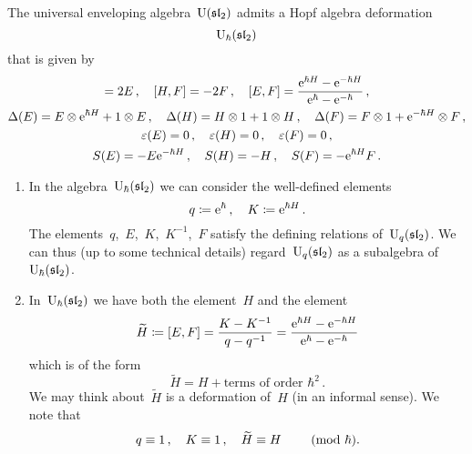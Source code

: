 \documentclass[a4paper, 11pt, oneside]{scrartcl}
\begin{document}
\begin{remark}
\end{remark}

\begin{theorem}
  The universal enveloping algebra~$\operatorname{U}(\mathfrak{sl}_2)$ admits a Hopf algebra deformation
  \[
    \operatorname{U}_{\hbar}(\mathfrak{sl}_2)
  \]
  that is given by
  \begin{gather*}
    [H, E] = 2E \,,
    \quad
    [H, F] = -2F \,,
    \quad
    [E, F]
    =
    \frac{ \e^{\hbar H} - \e^{-\hbar H} }{ \e^{\hbar} - \e^{-\hbar} } \,,
    \\
    \Delta(E) = E \tensor \e^{\hbar H} + 1 \tensor E \,,
    \quad
    \Delta(H) = H \tensor 1 + 1 \tensor H \,,
    \quad
    \Delta(F) = F \tensor 1 + \e^{-\hbar H} \tensor F \,,
    \\
    \varepsilon(E) = 0 \,,
    \quad
    \varepsilon(H) = 0 \,,
    \quad
    \varepsilon(F) = 0 \,,
    \\
    S(E) = -E \e^{-\hbar H} \,,
    \quad
    S(H) = -H \,,
    \quad
    S(F) = - \e^{\hbar H} F \,.
  \end{gather*}
\end{theorem}

\begin{remark}
  \leavevmode
  \begin{enumerate}
    \item
      In the algebra~$\operatorname{U}_{\hbar}(\mathfrak{sl}_2)$ we can consider the well-defined elements
      \[
        q \coloneqq \mathrm{e}^{\hbar} \,,
        \quad
        K \coloneqq \mathrm{e}^{\hbar H} \,.
      \]
      The elements~$q$,~$E$,~$K$,~$K^{-1}$,~$F$ satisfy the defining relations of~$\operatorname{U}_q(\mathfrak{sl}_2)$.
      We can thus (up to some technical details) regard~$\operatorname{U}_q(\mathfrak{sl}_2)$ as a subalgebra of~$\operatorname{U}_{\hbar}(\mathfrak{sl}_2)$.
    \item
      In~$\operatorname{U}_{\hbar}(\mathfrak{sl}_2)$ we have both the element~$H$ and the element
      \[
        \widetilde{H}
        \coloneqq
        [E,F]
        =
        \frac{K - K^{-1}}{q - q^{-1}}
        =
        \frac{\mathrm{e}^{\hbar H} - \mathrm{e}^{-\hbar H}}{\mathrm{e}^{\hbar} - \mathrm{e}^{-\hbar}}
      \]
      which is of the form
      \[
        \widetilde{H}
        =
        H + \text{terms of order~$\hbar^2$} \,.
      \]
      We may think about~$\widetilde{H}$ is a deformation of~$H$ (in an informal sense).
      We note that
      \[
        q \equiv 1 \,,
        \quad
        K \equiv 1 \,,
        \quad
        \widetilde{H} \equiv H
        \qquad
        \ (\mathrm{mod}\ \hbar).
      \]
  \end{enumerate}
\end{remark}
\end{document}
